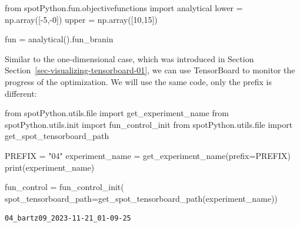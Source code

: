 \documentclass[
  letterpaper,
  DIV=11,
  numbers=noendperiod]{scrreprt}
\newenvironment{Shaded}{\begin{snugshade}}{\end{snugshade}}
\newcommand{\BuiltInTok}[1]{\textcolor[rgb]{0.00,0.23,0.31}{#1}}
\newcommand{\DecValTok}[1]{\textcolor[rgb]{0.68,0.00,0.00}{#1}}
\newcommand{\ImportTok}[1]{\textcolor[rgb]{0.00,0.46,0.62}{#1}}
\newcommand{\NormalTok}[1]{\textcolor[rgb]{0.00,0.23,0.31}{#1}}
\newcommand{\OperatorTok}[1]{\textcolor[rgb]{0.37,0.37,0.37}{#1}}
\newcommand{\StringTok}[1]{\textcolor[rgb]{0.13,0.47,0.30}{#1}}
\begin{document}
\begin{Shaded}
\begin{Highlighting}[]
\ImportTok{from}\NormalTok{ spotPython.fun.objectivefunctions }\ImportTok{import}\NormalTok{ analytical}
\NormalTok{lower }\OperatorTok{=}\NormalTok{ np.array([}\OperatorTok{{-}}\DecValTok{5}\NormalTok{,}\OperatorTok{{-}}\DecValTok{0}\NormalTok{])}
\NormalTok{upper }\OperatorTok{=}\NormalTok{ np.array([}\DecValTok{10}\NormalTok{,}\DecValTok{15}\NormalTok{])}
\end{Highlighting}
\end{Shaded}

\begin{Shaded}
\begin{Highlighting}[]
\NormalTok{fun }\OperatorTok{=}\NormalTok{ analytical().fun\_branin}
\end{Highlighting}
\end{Shaded}

\begin{tcolorbox}[enhanced jigsaw, left=2mm, toprule=.15mm, colframe=quarto-callout-note-color-frame, leftrule=.75mm, title=\textcolor{quarto-callout-note-color}{\faInfo}\hspace{0.5em}{TensorBoard}, toptitle=1mm, opacitybacktitle=0.6, arc=.35mm, titlerule=0mm, opacityback=0, bottomtitle=1mm, coltitle=black, rightrule=.15mm, colback=white, colbacktitle=quarto-callout-note-color!10!white, breakable, bottomrule=.15mm]

Similar to the one-dimensional case, which was introduced in Section
Section~\ref{sec-visualizing-tensorboard-01}, we can use TensorBoard to
monitor the progress of the optimization. We will use the same code,
only the prefix is different:

\begin{Shaded}
\begin{Highlighting}[]
\ImportTok{from}\NormalTok{ spotPython.utils.}\BuiltInTok{file} \ImportTok{import}\NormalTok{ get\_experiment\_name}
\ImportTok{from}\NormalTok{ spotPython.utils.init }\ImportTok{import}\NormalTok{ fun\_control\_init}
\ImportTok{from}\NormalTok{ spotPython.utils.}\BuiltInTok{file} \ImportTok{import}\NormalTok{ get\_spot\_tensorboard\_path}

\NormalTok{PREFIX }\OperatorTok{=} \StringTok{"04"}
\NormalTok{experiment\_name }\OperatorTok{=}\NormalTok{ get\_experiment\_name(prefix}\OperatorTok{=}\NormalTok{PREFIX)}
\BuiltInTok{print}\NormalTok{(experiment\_name)}

\NormalTok{fun\_control }\OperatorTok{=}\NormalTok{ fun\_control\_init(}
\NormalTok{    spot\_tensorboard\_path}\OperatorTok{=}\NormalTok{get\_spot\_tensorboard\_path(experiment\_name))}
\end{Highlighting}
\end{Shaded}

\begin{verbatim}
04_bartz09_2023-11-21_01-09-25
\end{verbatim}

\end{tcolorbox}
\end{document}
